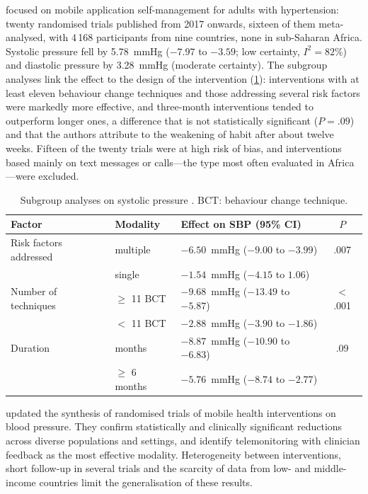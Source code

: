 \Textcite{zhou2024} focused on mobile application self-management for adults with hypertension: twenty randomised trials published from 2017 onwards, sixteen of them meta-analysed, with 4\,168 participants from nine countries, none in sub-Saharan Africa. Systolic pressure fell by 5.78~mmHg ($-7.97$ to $-3.59$; low certainty, $I^2 = 82\%$) and diastolic pressure by 3.28~mmHg (moderate certainty). The subgroup analyses link the effect to the design of the intervention (\cref{tab:subgroups}): interventions with at least eleven behaviour change techniques and those addressing several risk factors were markedly more effective, and three-month interventions tended to outperform longer ones, a difference that is not statistically significant ($P = .09$) and that the authors attribute to the weakening of habit after about twelve weeks. Fifteen of the twenty trials were at high risk of bias, and interventions based mainly on text messages or calls---the type most often evaluated in Africa---were excluded.

\begin{table}[htbp]
\centering\small
\caption{Subgroup analyses on systolic pressure \parencite{zhou2024}. BCT: behaviour change technique.}\label{tab:subgroups}
\begin{tabularx}{\textwidth}{@{}>{\raggedright\arraybackslash}p{3.3cm} >{\raggedright\arraybackslash}p{2.5cm} X c@{}}
\toprule
\textbf{Factor} & \textbf{Modality} & \textbf{Effect on SBP (95\% CI)} & \textbf{$P$} \\
\midrule
Risk factors addressed & multiple & $-6.50$~mmHg ($-9.00$ to $-3.99$) & .007 \\
                       & single   & $-1.54$~mmHg ($-4.15$ to $1.06$) & \\
\addlinespace
Number of techniques & $\geq$ 11 BCT & $-9.68$~mmHg ($-13.49$ to $-5.87$) & $<$.001 \\
                     & $<$ 11 BCT    & $-2.88$~mmHg ($-3.90$ to $-1.86$) & \\
\addlinespace
Duration & 3 months & $-8.87$~mmHg ($-10.90$ to $-6.83$) & .09 \\
         & $\geq$ 6 months & $-5.76$~mmHg ($-8.74$ to $-2.77$) & \\
\bottomrule
\end{tabularx}
\end{table}

\Textcite{bandeira2024} updated the synthesis of randomised trials of mobile health interventions on blood pressure. They confirm statistically and clinically significant reductions across diverse populations and settings, and identify telemonitoring with clinician feedback as the most effective modality. Heterogeneity between interventions, short follow-up in several trials and the scarcity of data from low- and middle-income countries limit the generalisation of these results.

